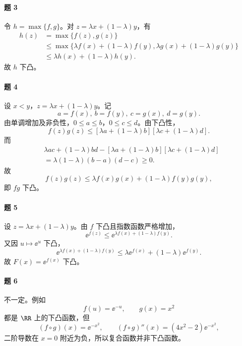 \paragraph{题 3}
\begin{xsolution}
令 $h=\max\{f,g\}$。对 $z=\lambda x+(1-\lambda)y$，有
\begin{align*}
  h(z)
  &=\max\{f(z),g(z)\}\\
  &\le\max\{\lambda f(x)+(1-\lambda)f(y),
             \lambda g(x)+(1-\lambda)g(y)\}\\
  &\le\lambda h(x)+(1-\lambda)h(y).
\end{align*}
故 $h$ 下凸。
\end{xsolution}

\paragraph{题 4}
\begin{xsolution}
设 $x<y$，$z=\lambda x+(1-\lambda)y$。记
\[
  a=f(x),\ b=f(y),\ c=g(x),\ d=g(y).
\]
由单调增加及非负性，$0\le a\le b$，$0\le c\le d$。由下凸性，
\[
  f(z)g(z)\le[\lambda a+(1-\lambda)b][\lambda c+(1-\lambda)d].
\]
而
\begin{align*}
 &\lambda ac+(1-\lambda)bd
 -[\lambda a+(1-\lambda)b][\lambda c+(1-\lambda)d]\\
 &=\lambda(1-\lambda)(b-a)(d-c)\ge0.
\end{align*}
故
\[
  f(z)g(z)\le\lambda f(x)g(x)+(1-\lambda)f(y)g(y),
\]
即 $fg$ 下凸。
\end{xsolution}

\paragraph{题 5}
\begin{xsolution}
设 $z=\lambda x+(1-\lambda)y$。由 $f$ 下凸且指数函数严格增加，
\[
  \ee^{f(z)}\le \ee^{\lambda f(x)+(1-\lambda)f(y)}.
\]
又因 $u\mapsto\ee^u$ 下凸，
\[
  \ee^{\lambda f(x)+(1-\lambda)f(y)}
  \le\lambda\ee^{f(x)}+(1-\lambda)\ee^{f(y)}.
\]
故 $F(x)=\ee^{f(x)}$ 下凸。
\end{xsolution}

\paragraph{题 6}
\begin{xsolution}
不一定。例如
\[
  f(u)=\ee^{-u},\qquad g(x)=x^2
\]
都是 $\RR$ 上的下凸函数，但
\[
  (f\circ g)(x)=\ee^{-x^2},
  \qquad
  (f\circ g)''(x)=(4x^2-2)\ee^{-x^2},
\]
二阶导数在 $x=0$ 附近为负，所以复合函数并非下凸函数。
\end{xsolution}

